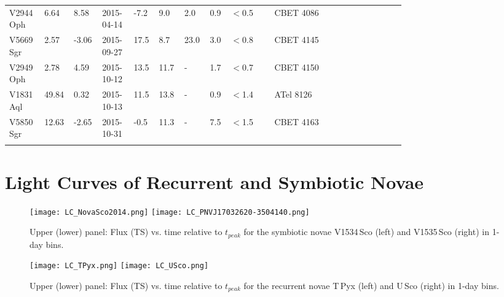 \documentclass{aa} %
\begin{document}
\begin{landscape}
\begin{tiny}
\begin{longtable*}{ L{0.07\linewidth} p{0.03\linewidth}  p{0.04\linewidth} p{0.07\linewidth} p{0.03\linewidth} p{0.04\linewidth} p{0.04\linewidth} p{0.03\linewidth} p{0.1\linewidth}  L{0.3\linewidth} }
V2944 Oph & 6.64 & 8.58 & 2015-04-14 & -7.2 & 9.0 & 2.0 & 0.9 & $<$0.5 & CBET 4086 \citep{CBET4086}\\
V5669 Sgr & 2.57 & -3.06 & 2015-09-27 & 17.5 & 8.7 & 23.0 & 3.0 & $<$0.8 & CBET 4145 \citep{CBET4145}\\
V2949 Oph & 2.78 & 4.59 & 2015-10-12 & 13.5 & 11.7 & - & 1.7 & $<$0.7 & CBET 4150 \citep{CBET4150}\\
V1831 Aql & 49.84 & 0.32 & 2015-10-13 & 11.5 & 13.8 & - & 0.9 & $<$1.4 & ATel 8126 \citep{ATel8126}\\
V5850 Sgr & 12.63 & -2.65 & 2015-10-31 & -0.5 & 11.3 & - & 7.5 & $<$1.5 & CBET 4163 \citep{CBET4163}\\
\hline
\hline
\label{tab:novaeList}
\end{longtable*}
\end{tiny}
\end{landscape}


\section{Light Curves of Recurrent and Symbiotic Novae}
\label{app:LC}

\begin{figure}[htb!]
\begin{center}
\texttt{[image: LC\_NovaSco2014.png]}
\texttt{[image: LC\_PNVJ17032620-3504140.png]}
\noindent
\caption{\small Upper (lower) panel: Flux (TS) vs. time relative to $t_{peak}$ for the symbiotic novae V1534\,Sco (left) and V1535\,Sco (right) in 1-day bins. }
\end{center}
\end{figure}


\begin{figure}[htb!]
\begin{center}
\texttt{[image: LC\_TPyx.png]}
\texttt{[image: LC\_USco.png]}
\noindent
\caption{\small Upper (lower) panel: Flux (TS) vs. time relative to $t_{peak}$ for the recurrent novae T\,Pyx (left) and U\,Sco (right) in 1-day bins. }
\end{center}
\end{figure}


\newpage

{\footnotesize
 }    
\end{document}
